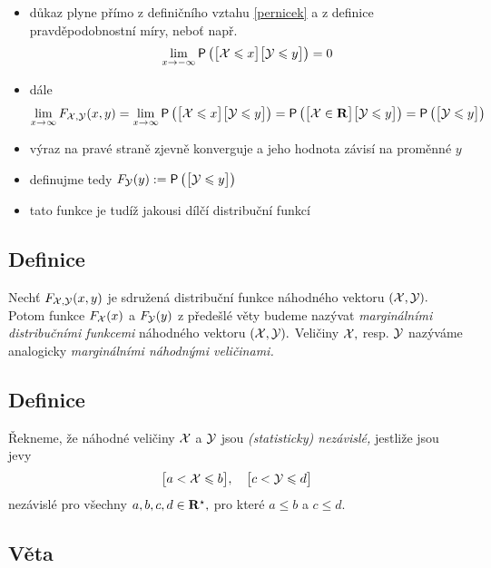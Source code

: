 \Proof

\begin{itemize}
\item d\r ukaz plyne p\v r\'imo z defini\v cn\'iho vztahu \eqref{pernicek} a z definice pravd\v epodobnostn\'i m\'iry, nebo\v t nap\v r. $$\lim_{x\rightarrow -\infty} \mbox{\sf P}\left(\bigl[{\mathcal X} \leqslant x\bigr]\bigl[{\mathcal Y} \leqslant y\bigr]\right)=0$$
\item  d\'ale $$ \lim_{x\rightarrow \infty} F_{{\mathcal X},{\mathcal Y}}(x,y) =  \lim_{x\rightarrow \infty} \mbox{\sf P}\left(\bigl[{\mathcal X} \leqslant x\bigr]\bigl[{\mathcal Y} \leqslant y\bigr]\right) = \mbox{\sf P}\left(\bigl[{\mathcal X} \in {\mathbf R} \bigr]\bigl[{\mathcal Y} \leqslant y\bigr]\right) = \mbox{\sf P}\left(\bigl[{\mathcal Y} \leqslant y\bigr]\right)$$
\item v\'yraz na prav\'e stran\v e zjevn\v e konverguje a jeho hodnota z\'avis\'i na prom\v enn\'e $y$
\item definujme tedy $F_{{\mathcal Y}}(y):= \mbox{\sf P}\left(\bigl[{\mathcal Y} \leqslant y\bigr]\right)$
\item tato funkce je tud\'i\v z jakousi d\'il\v c\'i distribu\v cn\'i funkc\'i
\end{itemize}

\subsection{Definice}

Nech\v t $F_{{\mathcal X},{\mathcal Y}}(x,y)$ je sdru\v zen\'a distribu\v cn\'i funkce n\'ahodn\'eho vektoru $({\mathcal X},{\mathcal Y}).$ Potom funkce $F_{{\mathcal X}}(x)$ a $F_{{\mathcal Y}}(y)$ z p\v rede\v sl\'e v\v ety budeme naz\'yvat \emph{margin\'aln\'imi distribu\v cn\'imi funkcemi} n\'ahodn\'eho vektoru $({\mathcal X},{\mathcal Y}).$ Veli\v ciny  ${\mathcal X},$ resp. ${\mathcal Y}$ naz\'yv\'ame analogicky \emph{margin\'aln\'imi n\'ahodn\'ymi veli\v cinami.}

\subsection{Definice}

\v Rekneme, \v ze n\'ahodn\'e veli\v ciny ${\mathcal X}$ a ${\mathcal Y}$ jsou \emph{(statisticky) nez\'avisl\'e,} jestli\v ze jsou jevy
%
$$\bigl[a< {\mathcal X} \leqslant b\bigr],\quad \bigl[c< {\mathcal Y} \leqslant d\bigr]$$
%
nez\'avisl\'e pro v\v sechny $a,b,c,d\in{\mathbf R}^\star,$ pro kter\'e $a \leq b$ a $c \leq d.$

\subsection{Věta}\label{distribucni_fce_pro_nezavisle}

